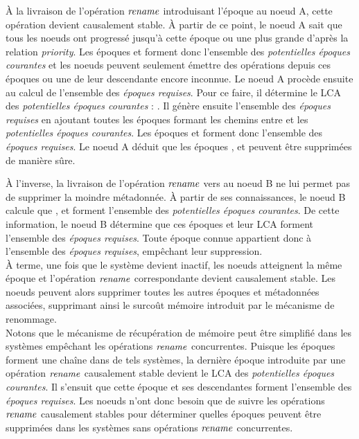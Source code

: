 À la livraison de l'opération $\mathit{rename}$ introduisant l'époque  au noeud A, cette opération devient causalement stable.
À partir de ce point, le noeud A sait que tous les noeuds ont progressé jusqu'à cette époque ou une plus grande d'après la relation \emph{priority}.
Les époques  et  forment donc l'ensemble des \emph{potentielles époques courantes} et les noeuds peuvent seulement émettre des opérations depuis ces époques ou une de leur descendante encore inconnue.
Le noeud A procède ensuite au calcul de l'ensemble des \emph{époques requises}.
Pour ce faire, il détermine le \ac{LCA} des \emph{potentielles époques courantes} : .
Il génère ensuite l'ensemble des \emph{époques requises} en ajoutant toutes les époques formant les chemins entre  et les \emph{potentielles époques courantes}.
Les époques  et  forment donc l'ensemble des \emph{époques requises}.
Le noeud A déduit que les époques ,  et  peuvent être supprimées de manière sûre.

À l'inverse, la livraison de l'opération $\mathit{rename}$ vers  au noeud B ne lui permet pas de supprimer la moindre métadonnée.
À partir de ses connaissances, le noeud B calcule que ,  et  forment l'ensemble des \emph{potentielles époques courantes}.
De cette information, le noeud B détermine que ces époques et leur \ac{LCA} forment l'ensemble des \emph{époques requises}.
Toute époque connue appartient donc à l'ensemble des \emph{époques requises}, empêchant leur suppression.\\

À terme, une fois que le système devient inactif, les noeuds atteignent la même époque et l'opération $\mathit{rename}$ correspondante devient causalement stable.
Les noeuds peuvent alors supprimer toutes les autres époques et métadonnées associées, supprimant ainsi le surcoût mémoire introduit par le mécanisme de renommage.\\

Notons que le mécanisme de récupération de mémoire peut être simplifié dans les systèmes empêchant les opérations $\mathit{rename}$ concurrentes.
Puisque les époques forment une chaîne dans de tels systèmes, la dernière époque introduite par une opération $\mathit{rename}$ causalement stable devient le \ac{LCA} des \emph{potentielles époques courantes}.
Il s'ensuit que cette époque et ses descendantes forment l'ensemble des \emph{époques requises}.
Les noeuds n'ont donc besoin que de suivre les opérations $\mathit{rename}$ causalement stables pour déterminer quelles époques peuvent être supprimées dans les systèmes sans opérations $\mathit{rename}$ concurrentes.\\

